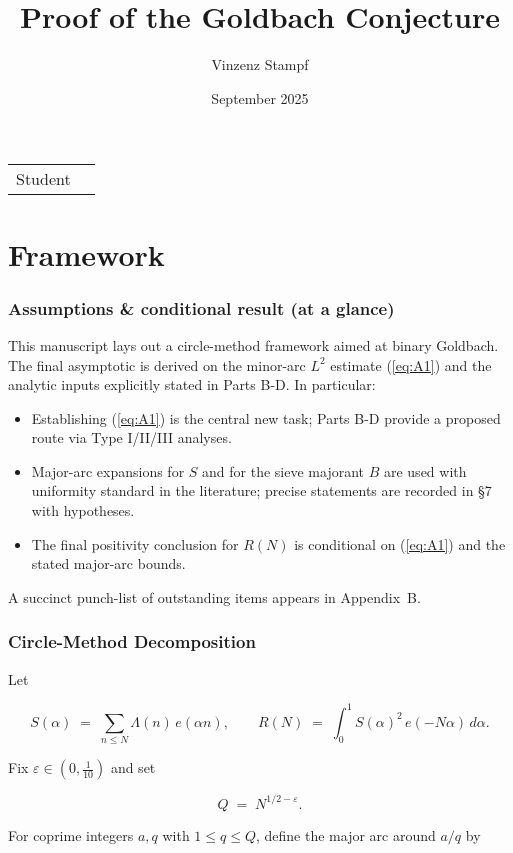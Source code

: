 \documentclass[11pt]{article}
\title{Proof of the Goldbach Conjecture}
\author{Vinzenz Stampf}
\date{September 2025}
\makeatletter
\def\eqref#1{(\ref{#1})}%
\theoremstyle{definition}
\theoremstyle{remark}
\numberwithin{equation}{part}
\providecommand{\theauthor}{\@author}
\makeatother
\begin{document}
\maketitle

\noindent\begin{tabular}{@{}ll}
	Student & \theauthor \\
\end{tabular}

\part{Framework}

\section{Assumptions \& conditional result (at a glance)}

This manuscript lays out a circle-method framework aimed at binary Goldbach. The final asymptotic is derived on the minor-arc $L^2$ estimate \eqref{eq:A1} and the analytic inputs explicitly stated in Parts B-D. In particular:

\begin{itemize}
	\item Establishing \eqref{eq:A1} is the central new task; Parts B-D provide a proposed route via Type I/II/III analyses.
	\item Major-arc expansions for $S$ and for the sieve majorant $B$ are used with uniformity standard in the literature; precise statements are recorded in §7 with hypotheses.
	\item The final positivity conclusion for $R(N)$ is conditional on \eqref{eq:A1} and the stated major-arc bounds.
\end{itemize}

A succinct punch-list of outstanding items appears in Appendix~B.

\section{Circle-Method Decomposition}

Let

$$
	S(\alpha)\;=\;\sum_{n\le N}\Lambda(n)\,e(\alpha n),\qquad
	R(N)\;=\;\int_{0}^{1} S(\alpha)^2\,e(-N\alpha)\,d\alpha .
$$

Fix $\varepsilon\in (0,\tfrac1{10})$ and set

$$
	Q \;=\; N^{1/2-\varepsilon}.
$$

For coprime integers $a,q$ with $1\le q\le Q$, define the major arc around $a/q$ by
\end{document}
